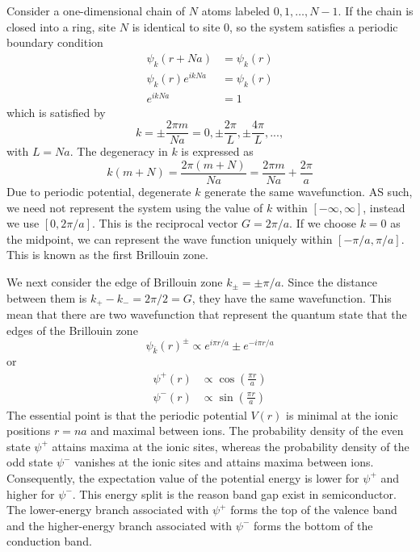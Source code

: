 \documentclass[../../../main.tex]{subfiles}
\begin{document}
Consider a one-dimensional chain of \(N\) atoms labeled \(0,1,\dots ,N-1\).
If the chain is closed into a ring, site \(N\) is identical to site \(0\), so the system satisfies a periodic boundary condition
\begin{align*}
    \psi_{k}(r + Na)    & =  \psi_{k}(r) \\
    \psi_{k}(r)e^{ikNa} & =  \psi_{k}(r) \\
    e^{ikNa}            & = 1
\end{align*}
which is satisfied by
\begin{equation*}
    k = \pm \frac{2 \pi m}{N a} = 0, \pm \frac{2 \pi}{L}, \pm \frac{4 \pi}{L}, ...,
\end{equation*}
with $L=Na$.
The degeneracy in $k$ is expressed as
\begin{equation*}
    k(m + N) = \frac{2\pi(m + N)}{Na} = \frac{2\pi m}{Na} + \frac{2\pi}{a}
\end{equation*}
Due to periodic potential, degenerate $k$ generate the same wavefunction.
AS such, we need not represent the system using the value of $k$ within $[-\infty,\infty]$, instead we use $[0,2 \pi/a]$.
This is the reciprocal vector $G=2\pi/a.$
If we choose $k=0$ as the midpoint, we can represent the wave function uniquely within $[-\pi/a,\pi/a]$.
This is known as the first Brillouin zone.


We next consider the edge of Brillouin zone $k_\pm = \pm \pi /a$.
Since the distance between them is $k_+ - k_- = 2\pi/2 = G$, they have the same wavefunction.
This mean that there are two wavefunction that represent the quantum state that the edges of the Brillouin zone
\begin{equation*}
    \psi_{\overline{k}}(r)^{\pm} \propto e^{i\pi r/a} \pm e^{-i\pi r/a}
\end{equation*}
or
\begin{align*}
    \psi^{+}(r) & \propto \cos \left(\frac{\pi r}{a}\right) \\
    \psi^{-}(r) & \propto \sin \left(\frac{\pi r}{a}\right)
\end{align*}
The essential point is that the periodic potential $V(r)$ is minimal at the ionic positions $r=na$ and maximal between ions.
The probability density of the even state $\psi^+$ attains maxima at the ionic sites, whereas the probability density of the odd state $\psi^-$ vanishes at the ionic sites and attains maxima between ions.
Consequently, the expectation value of the potential energy is lower for $\psi^+$ and higher for $\psi^-$.
This energy split is the reason band gap exist in semiconductor.
The lower-energy branch associated with $\psi^+$  forms the top of the valence band and the higher-energy branch associated with $\psi^-$ forms the bottom of the conduction band.
\end{document}
